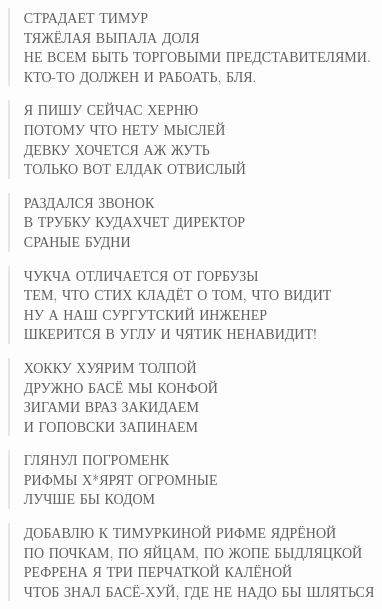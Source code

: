 \poemtitle{***}
\begin{verse}
СТРАДАЕТ ТИМУР\\
ТЯЖЁЛАЯ ВЫПАЛА ДОЛЯ\\
НЕ ВСЕМ БЫТЬ ТОРГОВЫМИ ПРЕДСТАВИТЕЛЯМИ.\\
КТО-ТО ДОЛЖЕН И РАБОАТЬ, БЛЯ.
\end{verse}

\poemtitle{***}
\begin{verse}
Я ПИШУ СЕЙЧАС ХЕРНЮ\\
ПОТОМУ ЧТО НЕТУ МЫСЛЕЙ\\
ДЕВКУ ХОЧЕТСЯ АЖ ЖУТЬ\\
ТОЛЬКО ВОТ ЕЛДАК ОТВИСЛЫЙ
\end{verse}

\poemtitle{***}
\begin{verse}
РАЗДАЛСЯ ЗВОНОК\\
В ТРУБКУ КУДАХЧЕТ ДИРЕКТОР\\
СРАНЫЕ БУДНИ
\end{verse}

\poemtitle{***}
\begin{verse}
ЧУКЧА ОТЛИЧАЕТСЯ ОТ ГОРБУЗЫ\\
ТЕМ, ЧТО СТИХ КЛАДЁТ О ТОМ, ЧТО ВИДИТ\\
НУ А НАШ СУРГУТСКИЙ ИНЖЕНЕР\\
ШКЕРИТСЯ В УГЛУ И ЧЯТИК НЕНАВИДИТ!
\end{verse}

\poemtitle{***}
\begin{verse}
ХОККУ ХУЯРИМ ТОЛПОЙ\\
ДРУЖНО БАСЁ МЫ КОНФОЙ\\
ЗИГАМИ ВРАЗ ЗАКИДАЕМ\\
И ГОПОВСКИ ЗАПИНАЕМ
\end{verse}

\poemtitle{***}
\begin{verse}
ГЛЯНУЛ ПОГРОМЕНК\\
РИФМЫ Х*ЯРЯТ ОГРОМНЫЕ\\
ЛУЧШЕ БЫ КОДОМ
\end{verse}

\poemtitle{***}
\begin{verse}
ДОБАВЛЮ К ТИМУРКИНОЙ РИФМЕ ЯДРЁНОЙ\\
ПО ПОЧКАМ, ПО ЯЙЦАМ, ПО ЖОПЕ БЫДЛЯЦКОЙ\\
РЕФРЕНА Я ТРИ ПЕРЧАТКОЙ КАЛЁНОЙ\\
ЧТОБ ЗНАЛ БАСЁ-ХУЙ, ГДЕ НЕ НАДО БЫ ШЛЯТЬСЯ
\end{verse}

